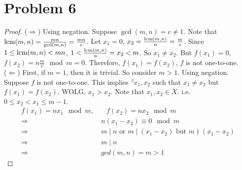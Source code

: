\section*{Problem 6}
	\begin{proof}
		($\Rightarrow$) Using negation. Suppose $\gcd(m, n) = c \neq 1$. Note that $\operatorname{lcm}(m, n) = \frac{mn}{\gcd(m, n)} = \frac{mn}{c}$. Let $x_1 = 0$, $x_2 = \frac{\operatorname{lcm}(m, n)}{n} = \frac{m}{c}$. Since $1 \leq \operatorname{lcm}(m, n) < mn$, $1 < \frac{\operatorname{lcm}(m, n)}{n} = x_2 < m$. So $x_1 \neq x_2$. But $f(x_1) = 0$, $f(x_2) = n\frac{m}{c} \mod m = 0$. Therefore, $f(x_1) = f(x_2)$, $f$ is not one-to-one.\\
		($\Leftarrow$) First, if $m = 1$, then it is trivial. So consider $m > 1$. Using negation. Suppose $f$ is not one-to-one. This implies $^\exists x_1, x_2$ such that $x_1 \neq x_2$ but $f(x_1) = f(x_2)$. WOLG, $x_1 > x_2$. Note that $x_1, x_2 \in X$. i.e. $0 \leq x_2 < x_1 \leq m - 1$.
		\begin{align*}
			f(x_1) = nx_1 \mod m,&\quad f(x_2) = nx_2 \mod m\\
			\Rightarrow&\ n(x_1 -x_2) \equiv 0 \mod m\\
			\Rightarrow&\ m \mid n\mbox{ or }m \mid(x_1 - x_2)\mbox{ but } m \nmid (x_1 - x_2)\\
			\Rightarrow&\ m \mid n\\
			\Rightarrow&\ gcd(m, n) = m > 1
		\end{align*}
	\end{proof}